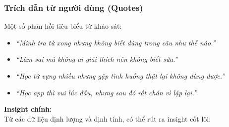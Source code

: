 \subsubsection{Trích dẫn từ người dùng (Quotes)}
Một số phản hồi tiêu biểu từ khảo sát:

\begin{itemize}
    \item \textit{“Mình tra từ xong nhưng không biết dùng trong câu như thế nào.”}
    \item \textit{“Làm sai mà không ai giải thích nên không biết sửa.”}
    \item \textit{“Học từ vựng nhiều nhưng gặp tình huống thật lại không dùng được.”}
    \item \textit{“Học app thì vui lúc đầu, nhưng sau đó rất chán vì lặp lại.”}
\end{itemize}

\vspace{10pt}
\textbf{Insight chính:} \\
Từ các dữ liệu định lượng và định tính, có thể rút ra insight cốt lõi: \\
